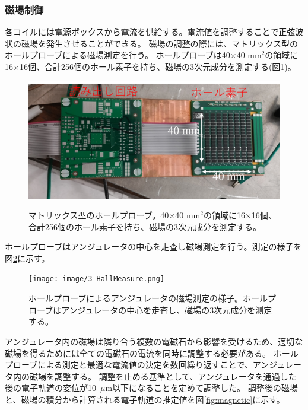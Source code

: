 \documentclass[a4paper,11pt,uplatex]{jsbook}
\begin{document}
\subsubsection{磁場制御}
各コイルには電源ボックスから電流を供給する。電流値を調整することで正弦波状の磁場を発生させることができる。
磁場の調整の際には、マトリックス型のホールプローブによる磁場測定を行う。
ホールプローブは40$\times$40 mm$^2$の領域に16$\times$16個、合計256個のホール素子を持ち、磁場の3次元成分を測定する(図\ref{hall})。
\begin{figure}[H]
  \centering
  \includegraphics[width=0.7\linewidth]{image/3-hallmatrix.png}\\
  \caption[ホールプローブ]{マトリックス型のホールプローブ。40$\times$40 mm$^2$の領域に16$\times$16個、合計256個のホール素子を持ち、磁場の3次元成分を測定する。}
  \label{hall}
\end{figure}
ホールプローブはアンジュレータの中心を走査し磁場測定を行う。測定の様子を図\ref{hallscan}に示す。
\begin{figure}[H]
  \centering
  \texttt{[image: image/3-HallMeasure.png]}\\
  \caption[ホールプローブの走査]{ホールプローブによるアンジュレータの磁場測定の様子。ホールプローブはアンジュレータの中心を走査し、磁場の3次元成分を測定する。}
  \label{hallscan}
\end{figure}
アンジュレータ内の磁場は隣り合う複数の電磁石から影響を受けるため、適切な磁場を得るためには全ての電磁石の電流を同時に調整する必要がある。
ホールプローブによる測定と最適な電流値の決定を数回繰り返すことで、アンジュレータ内の磁場を調整する。
調整を止める基準として、アンジュレータを通過した後の電子軌道の変位が10~$\mu$m以下になることを定めて調整した。
調整後の磁場と、磁場の積分から計算される電子軌道の推定値を図\ref{fig:magnetic}に示す。
\end{document}

